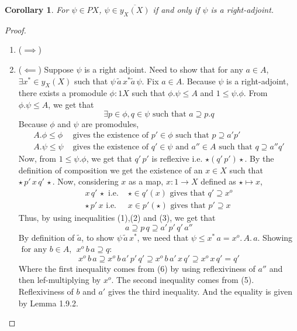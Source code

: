 \documentclass[18pt,a4paper]{article}
\makeatletter
\newtheorem{coro}{Corollary}[section]
\theoremstyle{definition}
\newcommand{\carrow}{}%
\DeclareRobustCommand{\carrow}{%
	\mathrel{\vphantom{\rightarrow}\mathpalette\circle@arrow\relax}%
}
\newcommand{\circle@arrow}[2]{%
	\m@th
	\ooalign{%
		\hidewidth$#1\circ\mkern1mu$\hidewidth\cr
	$#1\longrightarrow$\cr}%
}
\makeatother
\begin{document}
\begin{coro}
	For $\psi \in PX$, $\psi \in \overline{y_X(X)}$ if and only if $\psi$ is a right-adjoint.
\end{coro}
\begin{proof}
	\setcounter{equation}{0}
	\begin{enumerate}[label=(\roman*)]
		\item ($\implies$)
		\item ($\impliedby$) Suppose $\psi$ is a right adjoint. Need to show that for any
			$a \in A$, $\exists x^* \in y_X(X)$ such that $\psi \, \tilde{a} \,x^*
			\tilde{a} \, \psi$. Fix $a \in A$. Because $\psi$ is a right-adjoint, there
			exists a promodule $\phi: 1 \carrow X$ such that $\phi.\psi \leq A$ and
			$1\leq \psi.\phi$. From $\phi.\psi \leq A$, we get that
			\begin{equation}\exists p \in \phi, q \in \psi \text{ such that }
				a \supseteq p.q
			\end{equation}
			Because $\phi$ and $\psi$ are promodules,
			\begin{align}
		A.\phi \leq \phi & \text{ gives the existence of } p' \in \phi \text{ such that } p\supseteq a'p'  \\
		A.\psi \leq \psi & \text{ gives the existence of } q' \in \psi \text{ and } a'' \in A
		\text{ such that } q \supseteq a''q'
			\end{align}
			Now, from $1 \leq \psi.\phi$, we get that $q'\,p'$ is reflexive i.e. $\star (q' \,p')
			\star$. By the definition of composition we get the existence of an $x \in X$
			such that $\star \, p' \, x \,q'\,\star$. Now, considering $x$ as a map, $x:1 \to X$
			defined as $\star \mapsto x$,
			\begin{align}
				x \, q' \, \star \text{ i.e. } &\star \in q'(x) \text{ gives that }
				 q' \supseteq x^o \\
				\star \,p' \, x \text{ i.e. } &x \in p'(\star) \text{ gives that }
				p'\supseteq x
			\end{align}
			Thus, by using inequalities (1),(2) and (3), we get that
			\begin{equation}
				a \supseteq p\,q \supseteq a'\,p'\,q'\,a''
			\end{equation}
			By definition of $\tilde{a}$, to show $\psi \, \tilde{a} \, x^*$,
			we need that $\psi \leq x^*\,a=x^o.\,A.\,a$. Showing
			$\text{ for any } b\in A$, $\;  x^o\,b\,a \supseteq q$:
			\[ x^o\,b\,a \supseteq x^o\,b\,a'\,p'\,q' \supseteq x^o\,b\,a'\,x\,q'
			 \supseteq x^o\,x\,q'=q'\]
			 Where the first inequality comes from (6) by using reflexiviness of $a''$ and then
			 lef-multiplying by $x^o$. The second inequality comes from (5). Reflexiviness of $b$
			 and $a'$ gives the third inequality. And the equality is given by Lemma 1.9.2.


\end{enumerate}
\end{proof}
\end{document}
